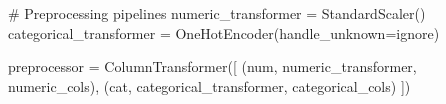 \documentclass[
  letterpaper,
  DIV=11,
  numbers=noendperiod]{scrreprt}
\newenvironment{Shaded}{\begin{snugshade}}{\end{snugshade}}
\newcommand{\CommentTok}[1]{\textcolor[rgb]{0.37,0.37,0.37}{#1}}
\newcommand{\NormalTok}[1]{\textcolor[rgb]{0.00,0.23,0.31}{#1}}
\newcommand{\OperatorTok}[1]{\textcolor[rgb]{0.37,0.37,0.37}{#1}}
\newcommand{\StringTok}[1]{\textcolor[rgb]{0.13,0.47,0.30}{#1}}
\begin{document}
\begin{Shaded}
\begin{Highlighting}[]
\CommentTok{\# Preprocessing pipelines}
\NormalTok{numeric\_transformer }\OperatorTok{=}\NormalTok{ StandardScaler()}
\NormalTok{categorical\_transformer }\OperatorTok{=}\NormalTok{ OneHotEncoder(handle\_unknown}\OperatorTok{=}\StringTok{\textquotesingle{}ignore\textquotesingle{}}\NormalTok{)}

\NormalTok{preprocessor }\OperatorTok{=}\NormalTok{ ColumnTransformer([}
\NormalTok{    (}\StringTok{\textquotesingle{}num\textquotesingle{}}\NormalTok{, numeric\_transformer, numeric\_cols),}
\NormalTok{    (}\StringTok{\textquotesingle{}cat\textquotesingle{}}\NormalTok{, categorical\_transformer, categorical\_cols)}
\NormalTok{])}
\end{Highlighting}
\end{Shaded}
\end{document}
